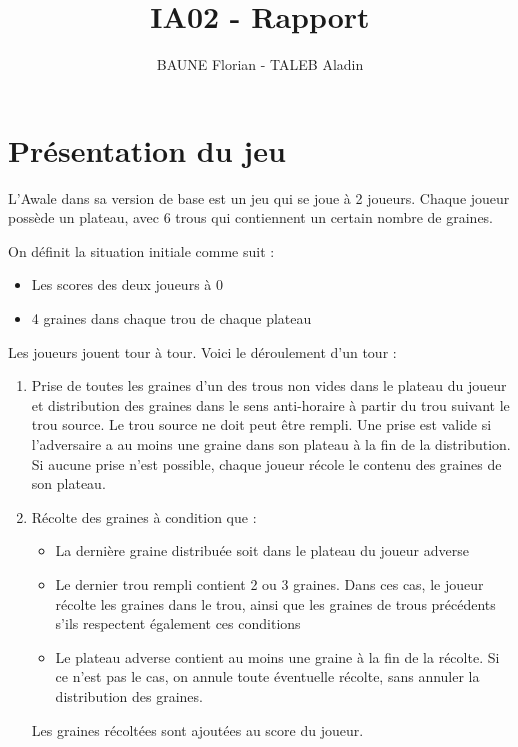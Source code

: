 \documentclass[]{article}
\title{IA02 - Rapport}
\author{BAUNE Florian - TALEB Aladin}
\date{}
\begin{document}
\maketitle

\begin{abstract}

\end{abstract}

\section{Présentation du jeu}

L'Awale dans sa version de base est un jeu qui se joue à 2 joueurs. Chaque joueur possède un plateau, avec 6 trous qui contiennent un certain nombre de graines.

On définit la situation initiale comme suit : 
\begin{itemize}
\item Les scores des deux joueurs à 0
\item 4 graines dans chaque trou de chaque plateau
\end{itemize}

Les joueurs jouent tour à tour. Voici le déroulement d'un tour : 

\begin{enumerate}
\item Prise de toutes les graines d'un des trous non vides dans le plateau du joueur et distribution des graines dans le sens anti-horaire à partir du trou suivant le trou source. Le trou source ne doit peut être rempli.
\subitem Une prise est valide si l'adversaire a au moins une graine dans son plateau à la fin de la distribution. Si aucune prise n'est possible, chaque joueur récole le contenu des graines de son plateau.
\item Récolte des graines à condition que :
	\begin{itemize}
	\item La dernière graine distribuée soit dans le plateau du joueur adverse
	\item Le dernier trou rempli contient 2 ou 3 graines. 
	\subitem Dans ces cas, le joueur récolte les graines dans le trou, ainsi que les graines de trous précédents s'ils respectent également ces conditions
	\item Le plateau adverse contient au moins une graine à la fin de la récolte. Si ce n'est pas le cas, on annule toute éventuelle récolte, sans annuler la distribution des graines.
	\end{itemize}
	\subitem Les graines récoltées sont ajoutées au score du joueur.
\end{enumerate}
\end{document}
